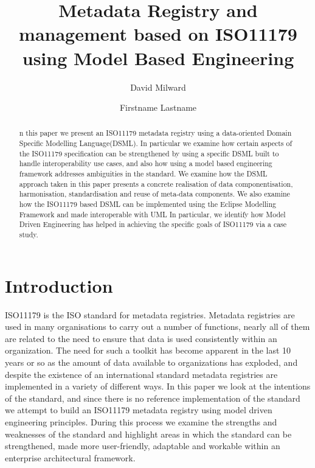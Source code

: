 \documentclass{llncs}
\begin{document}
 

\title{Metadata Registry and management based on ISO11179 using Model Based Engineering}

\author{David Milward \and Firstname Lastname}
\maketitle

\begin{abstract}
n this paper we present an ISO11179 metadata registry using a data-oriented Domain Specific Modelling Language(DSML). In particular we examine how certain aspects of the ISO11179 specification can be strengthened by using a specific DSML built to handle interoperability use cases, and also how using a model based engineering framework addresses ambiguities in the standard. We examine how the DSML approach taken in this paper presents a concrete realisation of data componentisation, harmonisation, standardisation and reuse of meta-data components. We also examine how the ISO11179 based DSML can be implemented using the Eclipse Modelling Framework and made interoperable with UML In particular, we identify how Model Driven Engineering has helped in achieving the specific goals of ISO11179 via a case study.

\end{abstract}


\noindent

\section{Introduction}

ISO11179 is the ISO standard for metadata registries. Metadata registries are used in many organisations to carry out a number of functions, nearly all of them are related to the need to ensure that data is used consistently within an organization.  The need for such a toolkit has become apparent in the last 10 years or so as the amount of data available to organizations has exploded, and despite the existence of an international standard metadata registries are implemented in a variety of different ways. In this paper we look at the intentions of the standard, and since there is no reference implementation of the standard we attempt to build an ISO11179 metadata registry using model driven engineering principles. During this process we examine the strengths and weaknesses of the standard and highlight areas in which the standard can be strengthened, made more user-friendly, adaptable and workable within an enterprise architectural framework. 
\end{document}
